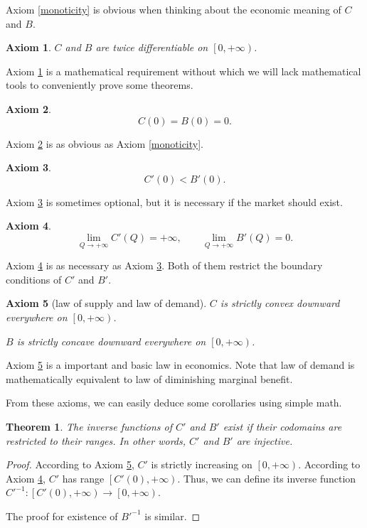 \documentclass{article}
\newtheorem{axiom}{Axiom}[subsection]
\newtheorem{theorem}{Theorem}[subsection]
\begin{document}
Axiom \ref{monoticity} is obvious when thinking about the economic meaning of $C$ and $B$.

\begin{axiom}
\label{smoothness}
$C$ and $B$ are twice differentiable on $\left[0,+\infty\right)$.
\end{axiom}

Axiom \ref{smoothness} is a mathematical requirement
without which we will lack mathematical tools to conveniently prove some theorems.

\begin{axiom}
\label{initial cost and benefit}
$$C\!\left(0\right)=B\!\left(0\right)=0.$$
\end{axiom}

Axiom \ref{initial cost and benefit} is as obvious as Axiom \ref{monoticity}.

\begin{axiom}
\label{initial supply and demand}
$$C'\!\left(0\right)<B'\!\left(0\right).$$
\end{axiom}

Axiom \ref{initial supply and demand} is sometimes optional,
but it is necessary if the market should exist.

\begin{axiom}
\label{inf}
$$\lim_{Q\to+\infty}C'\!\left(Q\right)=+\infty,
\qquad\lim_{Q\to+\infty}B'\!\left(Q\right)=0.$$
\end{axiom}

Axiom \ref{inf} is as necessary as Axiom \ref{initial supply and demand}.
Both of them restrict the boundary conditions of $C'$ and $B'$.

\begin{axiom}[law of supply and law of demand]
\label{law of supply and demand}
$C$ is strictly convex downward everywhere on $\left[0,+\infty\right)$.

$B$ is strictly concave downward everywhere on $\left[0,+\infty\right)$.
\end{axiom}

Axiom \ref{law of supply and demand} is a important and basic law in economics.
Note that law of demand is mathematically equivalent to law of diminishing marginal benefit.

From these axioms, we can easily deduce some corollaries using simple math.

\begin{theorem}
\label{inverse supply and demand}
The inverse functions of $C'$ and $B'$ exist if their codomains are restricted to their ranges.
In other words, $C'$ and $B'$ are injective.
\end{theorem}
\begin{proof}
According to Axiom \ref{law of supply and demand}, $C'$ is strictly increasing on $\left[0,+\infty\right)$.
According to Axiom \ref{inf}, $C'$ has range $\left[C'\!\left(0\right),+\infty\right)$.
Thus, we can define its inverse function $C'^{-1}:\left[C'\!\left(0\right),+\infty\right)\to\left[0,+\infty\right)$.

The proof for existence of $B'^{-1}$ is similar.
\end{proof}
\end{document}
